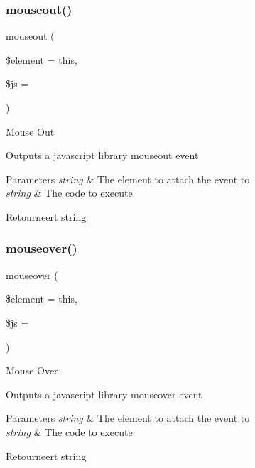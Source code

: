 \subsubsection{\texorpdfstring{mouseout()}{mouseout()}}
{\footnotesize\ttfamily mouseout (\begin{DoxyParamCaption}\item[{}]{\$element = {\ttfamily \textquotesingle{}this\textquotesingle{}},  }\item[{}]{\$js = {\ttfamily \textquotesingle{}\textquotesingle{}} }\end{DoxyParamCaption})}

Mouse Out

Outputs a javascript library mouseout event


\begin{DoxyParams}{Parameters}
{\em string} & The element to attach the event to \\
\hline
{\em string} & The code to execute \\
\hline
\end{DoxyParams}
\begin{DoxyReturn}{Retourneert}
string 
\end{DoxyReturn}
\mbox{\label{class_c_i___javascript_af54e0f954a0bb3983011578c848faf48}} 
\subsubsection{\texorpdfstring{mouseover()}{mouseover()}}
{\footnotesize\ttfamily mouseover (\begin{DoxyParamCaption}\item[{}]{\$element = {\ttfamily \textquotesingle{}this\textquotesingle{}},  }\item[{}]{\$js = {\ttfamily \textquotesingle{}\textquotesingle{}} }\end{DoxyParamCaption})}

Mouse Over

Outputs a javascript library mouseover event


\begin{DoxyParams}{Parameters}
{\em string} & The element to attach the event to \\
\hline
{\em string} & The code to execute \\
\hline
\end{DoxyParams}
\begin{DoxyReturn}{Retourneert}
string 
\end{DoxyReturn}
\mbox{\label{class_c_i___javascript_a31b2b5c28657895274f5658517a2342a}} 
